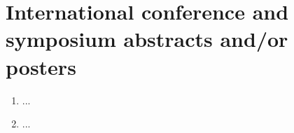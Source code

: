 \section*{International conference and symposium abstracts and/or posters}



\begin{enumerate}
	
	
	\item ...


	\item ...

\end{enumerate}
